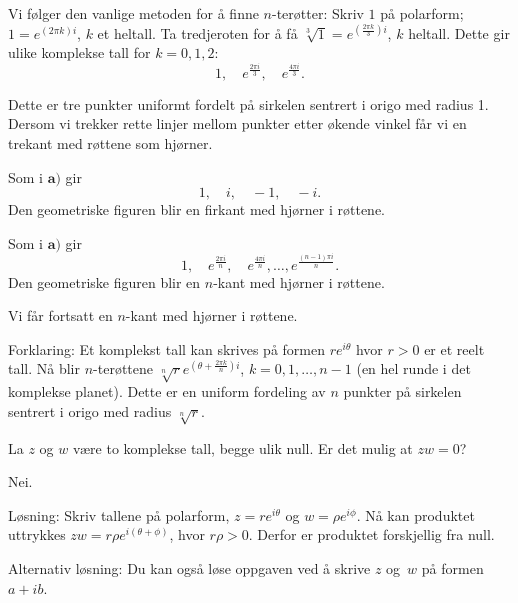 \begin{losning}

\begin{punkt}
Vi følger den vanlige metoden for å finne $n$-terøtter: Skriv $1$ på polarform; $1=e^{(2\pi k )i}$, $k$ et heltall. Ta tredjeroten for å få $\sqrt[3]{1}=e^{(\frac{2\pi k}{3} )i}$, $k$ heltall. Dette gir ulike komplekse tall for $k=0,1,2$: 
$$1,\quad e^{\frac{2\pi i}{3}}, \quad e^{\frac{4\pi i}{3}}.$$ 

\noindent
Dette er tre punkter uniformt fordelt på sirkelen sentrert i origo med radius 1. Dersom vi trekker rette linjer mellom punkter etter økende vinkel får vi en trekant med røttene som hjørner.
\end{punkt}

\begin{punkt}
Som i $\textbf{a)}$ gir $$1,\quad i,\quad -1, \quad -i. $$ Den geometriske figuren blir en firkant med hjørner i røttene.
\end{punkt}

\begin{punkt}
Som i $\textbf{a)}$ gir $$1,\quad e^{\frac{2\pi i}{n}},\quad e^{\frac{4\pi i}{n}},\dots,e^{\frac{(n-1)\pi i}{n}}.$$ Den geometriske figuren blir en $n$-kant med hjørner i røttene.
\end{punkt}

\begin{punkt}
Vi får fortsatt en $n$-kant med hjørner i røttene.

\noindent
Forklaring: Et komplekst tall kan skrives på formen $re^{i\theta}$ hvor $r>0$ er et reelt tall. Nå blir $n$-terøttene $\sqrt[n]{r}e^{(\theta+\frac{2\pi k}{n})i}$, $k=0,1,\dots, n-1$ (en hel runde i det komplekse planet). Dette er en uniform fordeling av $n$ punkter på sirkelen sentrert i origo med radius $\sqrt[n]{r}$.
\end{punkt}

\end{losning}

\begin{oppgave}
La $z$ og $w$ være to komplekse tall, begge ulik null. Er det mulig at $zw=0$?
\end{oppgave}

\begin{losning}
Nei.

\noindent
Løsning: Skriv tallene på polarform, $z=re^{i\theta}$ og $w=\rho e^{i\phi}$. Nå kan produktet uttrykkes $zw=r\rho e^{i(\theta+\phi)}$, hvor $r \rho>0$. Derfor er produktet forskjellig fra null.

\noindent
Alternativ løsning: Du kan også løse oppgaven ved å skrive $z$ og~$w$ på formen $a+ib$.
\end{losning}



